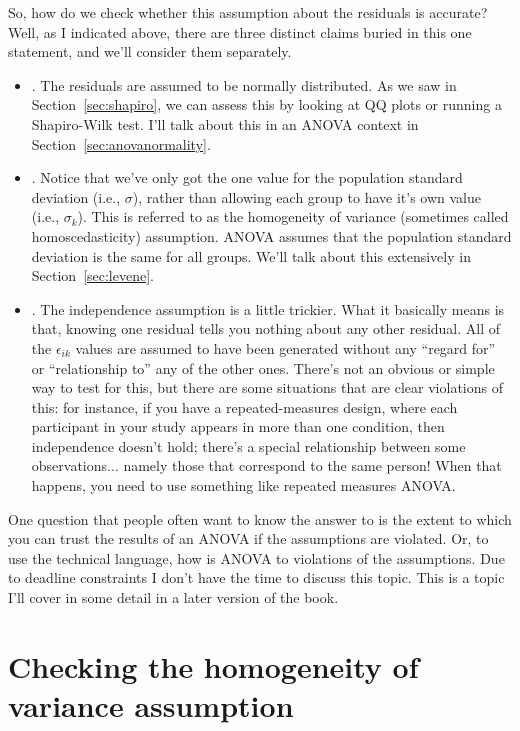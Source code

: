 So, how do we check whether this assumption about the residuals is accurate? Well, as I indicated above, there are three distinct claims buried in this one statement, and we'll consider them separately.
\begin{itemize}
\item {}. The residuals are assumed to be normally distributed. As we saw in Section~\ref{sec:shapiro}, we can assess this by looking at QQ plots or running a Shapiro-Wilk test. I'll talk about this in an ANOVA context in Section~\ref{sec:anovanormality}. 
\item {}. Notice that we've only got the one value for the population standard deviation (i.e., $\sigma$), rather than allowing each group to have it's own value (i.e., $\sigma_k$). This is referred to as the homogeneity of variance (sometimes called homoscedasticity) assumption. ANOVA assumes that the population standard deviation is the same for all groups. We'll talk about this extensively in Section~\ref{sec:levene}. 
\item {}. The independence assumption is a little trickier. What it basically means is that, knowing one residual tells you nothing about any other residual. All of the $\epsilon_{ik}$ values are assumed to have been generated without any ``regard for'' or ``relationship to'' any of the other ones. There's not an obvious or simple way to test for this, but there are some situations that are clear violations of this: for instance, if you have a repeated-measures design, where each participant in your study appears in more than one condition, then independence doesn't hold; there's a special relationship between some observations... namely those that correspond to the same person! When that happens, you need to use something like repeated measures ANOVA. 
\end{itemize}


One question that people often want to know the answer to is the extent to which you can trust the results of an ANOVA if the assumptions are violated. Or, to use the technical language, how  is ANOVA to violations of the assumptions. Due to deadline constraints I don't have the time to discuss this topic. This is a topic I'll cover in some detail in a later version of the book. 

\section{Checking the homogeneity of variance assumption~\label{sec:levene}}

